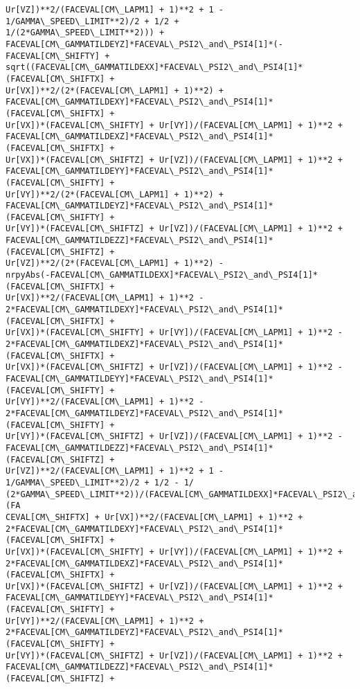 \documentclass[landscape,letterpaper,10pt,english]{article}
\begin{document}
\begin{Verbatim}[commandchars=\\\{\}]
Ur[VZ])**2/(FACEVAL[CM\_LAPM1] + 1)**2 + 1 - 1/GAMMA\_SPEED\_LIMIT**2)/2 + 1/2 +
1/(2*GAMMA\_SPEED\_LIMIT**2))) +
FACEVAL[CM\_GAMMATILDEYZ]*FACEVAL\_PSI2\_and\_PSI4[1]*(-FACEVAL[CM\_SHIFTY] +
sqrt((FACEVAL[CM\_GAMMATILDEXX]*FACEVAL\_PSI2\_and\_PSI4[1]*(FACEVAL[CM\_SHIFTX] +
Ur[VX])**2/(2*(FACEVAL[CM\_LAPM1] + 1)**2) +
FACEVAL[CM\_GAMMATILDEXY]*FACEVAL\_PSI2\_and\_PSI4[1]*(FACEVAL[CM\_SHIFTX] +
Ur[VX])*(FACEVAL[CM\_SHIFTY] + Ur[VY])/(FACEVAL[CM\_LAPM1] + 1)**2 +
FACEVAL[CM\_GAMMATILDEXZ]*FACEVAL\_PSI2\_and\_PSI4[1]*(FACEVAL[CM\_SHIFTX] +
Ur[VX])*(FACEVAL[CM\_SHIFTZ] + Ur[VZ])/(FACEVAL[CM\_LAPM1] + 1)**2 +
FACEVAL[CM\_GAMMATILDEYY]*FACEVAL\_PSI2\_and\_PSI4[1]*(FACEVAL[CM\_SHIFTY] +
Ur[VY])**2/(2*(FACEVAL[CM\_LAPM1] + 1)**2) +
FACEVAL[CM\_GAMMATILDEYZ]*FACEVAL\_PSI2\_and\_PSI4[1]*(FACEVAL[CM\_SHIFTY] +
Ur[VY])*(FACEVAL[CM\_SHIFTZ] + Ur[VZ])/(FACEVAL[CM\_LAPM1] + 1)**2 +
FACEVAL[CM\_GAMMATILDEZZ]*FACEVAL\_PSI2\_and\_PSI4[1]*(FACEVAL[CM\_SHIFTZ] +
Ur[VZ])**2/(2*(FACEVAL[CM\_LAPM1] + 1)**2) -
nrpyAbs(-FACEVAL[CM\_GAMMATILDEXX]*FACEVAL\_PSI2\_and\_PSI4[1]*(FACEVAL[CM\_SHIFTX] +
Ur[VX])**2/(FACEVAL[CM\_LAPM1] + 1)**2 -
2*FACEVAL[CM\_GAMMATILDEXY]*FACEVAL\_PSI2\_and\_PSI4[1]*(FACEVAL[CM\_SHIFTX] +
Ur[VX])*(FACEVAL[CM\_SHIFTY] + Ur[VY])/(FACEVAL[CM\_LAPM1] + 1)**2 -
2*FACEVAL[CM\_GAMMATILDEXZ]*FACEVAL\_PSI2\_and\_PSI4[1]*(FACEVAL[CM\_SHIFTX] +
Ur[VX])*(FACEVAL[CM\_SHIFTZ] + Ur[VZ])/(FACEVAL[CM\_LAPM1] + 1)**2 -
FACEVAL[CM\_GAMMATILDEYY]*FACEVAL\_PSI2\_and\_PSI4[1]*(FACEVAL[CM\_SHIFTY] +
Ur[VY])**2/(FACEVAL[CM\_LAPM1] + 1)**2 -
2*FACEVAL[CM\_GAMMATILDEYZ]*FACEVAL\_PSI2\_and\_PSI4[1]*(FACEVAL[CM\_SHIFTY] +
Ur[VY])*(FACEVAL[CM\_SHIFTZ] + Ur[VZ])/(FACEVAL[CM\_LAPM1] + 1)**2 -
FACEVAL[CM\_GAMMATILDEZZ]*FACEVAL\_PSI2\_and\_PSI4[1]*(FACEVAL[CM\_SHIFTZ] +
Ur[VZ])**2/(FACEVAL[CM\_LAPM1] + 1)**2 + 1 - 1/GAMMA\_SPEED\_LIMIT**2)/2 + 1/2 - 1/
(2*GAMMA\_SPEED\_LIMIT**2))/(FACEVAL[CM\_GAMMATILDEXX]*FACEVAL\_PSI2\_and\_PSI4[1]*(FA
CEVAL[CM\_SHIFTX] + Ur[VX])**2/(FACEVAL[CM\_LAPM1] + 1)**2 +
2*FACEVAL[CM\_GAMMATILDEXY]*FACEVAL\_PSI2\_and\_PSI4[1]*(FACEVAL[CM\_SHIFTX] +
Ur[VX])*(FACEVAL[CM\_SHIFTY] + Ur[VY])/(FACEVAL[CM\_LAPM1] + 1)**2 +
2*FACEVAL[CM\_GAMMATILDEXZ]*FACEVAL\_PSI2\_and\_PSI4[1]*(FACEVAL[CM\_SHIFTX] +
Ur[VX])*(FACEVAL[CM\_SHIFTZ] + Ur[VZ])/(FACEVAL[CM\_LAPM1] + 1)**2 +
FACEVAL[CM\_GAMMATILDEYY]*FACEVAL\_PSI2\_and\_PSI4[1]*(FACEVAL[CM\_SHIFTY] +
Ur[VY])**2/(FACEVAL[CM\_LAPM1] + 1)**2 +
2*FACEVAL[CM\_GAMMATILDEYZ]*FACEVAL\_PSI2\_and\_PSI4[1]*(FACEVAL[CM\_SHIFTY] +
Ur[VY])*(FACEVAL[CM\_SHIFTZ] + Ur[VZ])/(FACEVAL[CM\_LAPM1] + 1)**2 +
FACEVAL[CM\_GAMMATILDEZZ]*FACEVAL\_PSI2\_and\_PSI4[1]*(FACEVAL[CM\_SHIFTZ] +

\end{Verbatim}
\end{document}
